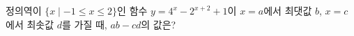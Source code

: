 정의역이 $\{x \mid -1 \le x \le 2\}$인 함수 $y=4^{x}-2^{x+2}+1$이 $x=a$에서 최댓값 $b$, $x=c$에서 최솟값 $d$를 가질 때, $ab-cd$의 값은?
